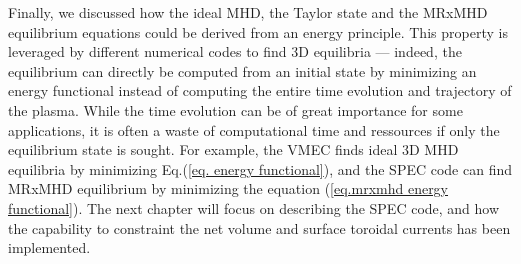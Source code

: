 \documentclass[my_thesis.tex]{subfiles}
\begin{document}
Finally, we discussed how the ideal MHD, the Taylor state and the MRxMHD equilibrium equations could be derived from an energy principle. This property is leveraged by different numerical codes to find 3D equilibria --- indeed, the equilibrium can directly be computed from an initial state by minimizing an energy functional instead of computing the entire time evolution and trajectory of the plasma. While the time evolution can be of great importance for some applications, it is often a waste of computational time and ressources if only the equilibrium state is sought. For example, the \ac{VMEC} \citep{Hirshman1983,Hirshman1986} finds ideal 3D MHD equilibria by minimizing Eq.(\ref{eq. energy functional}), and the \ac{SPEC} code \citep{hudsonComputationMultiregionRelaxed2012,Hudson2020c} can find MRxMHD equilibrium by minimizing the equation (\ref{eq.mrxmhd energy functional}). The next chapter will focus on describing the \ac{SPEC} code, and how the capability to constraint the net volume and surface toroidal currents has been implemented.








\end{document}
